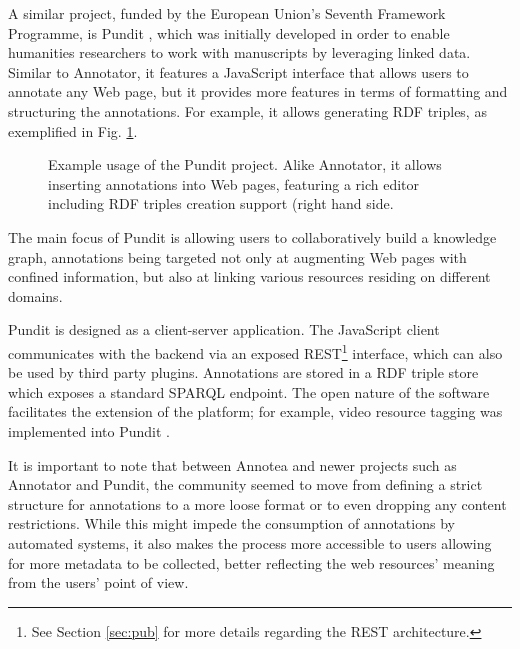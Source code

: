 A similar project, funded by the European Union's Seventh Framework Programme,
is Pundit \cite{ref:pundit}, which was initially developed in order to enable
humanities researchers to work with manuscripts by leveraging linked data.
Similar to Annotator, it features a JavaScript interface that allows users to
annotate any Web page, but it provides more features in terms of formatting and
structuring the annotations. For example, it allows generating RDF triples, as
exemplified in Fig. \ref{fig:pundit}.

\begin{figure}[!ht]
  \centering
  \caption[Example usage of the Pundit project]
          {Example usage of the Pundit project. Alike Annotator, it allows
           inserting annotations into Web pages, featuring a rich editor
           including RDF triples creation support (right hand side.}
  \label{fig:pundit}
\end{figure}

The main focus of Pundit is allowing users to collaboratively build a knowledge
graph, annotations being targeted not only at augmenting Web pages with
confined information, but also at linking various resources residing on
different domains.

Pundit is designed as a client-server application. The JavaScript client
communicates with the backend via an exposed REST\footnote{See Section
\ref{sec:pub} for more details regarding the REST architecture.} interface,
which can also be used by third party plugins. Annotations are stored in a RDF
triple store which exposes a standard SPARQL \cite{ref:sparql} endpoint. The
open nature of the software facilitates the extension of the platform; for
example, video resource tagging was implemented into Pundit
\cite{ref:punditvideo}.

It is important to note that between Annotea and newer projects such as
Annotator and Pundit, the community seemed to move from defining a strict
structure for annotations to a more loose format or to even dropping any
content restrictions. While this might impede the consumption of annotations by
automated systems, it also makes the process more accessible to users allowing
for more metadata to be collected, better reflecting the web resources' meaning
from the users' point of view\cite{ref:wu}.
